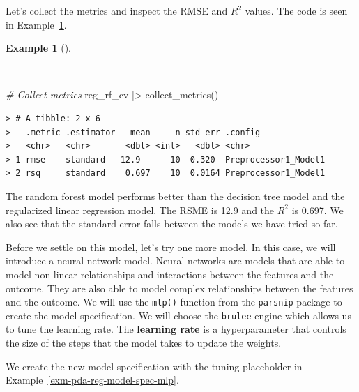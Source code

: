 \documentclass[
  letterpaper,
]{latex/krantz}
\newenvironment{Shaded}{\begin{snugshade}}{\end{snugshade}}
\newcommand{\CommentTok}[1]{\textcolor[rgb]{0.00,0.00,0.00}{\textit{#1}}}
\newcommand{\FunctionTok}[1]{\textcolor[rgb]{0.00,0.00,0.00}{#1}}
\newcommand{\NormalTok}[1]{\textcolor[rgb]{0.00,0.00,0.00}{#1}}
\newcommand{\SpecialCharTok}[1]{\textcolor[rgb]{0.00,0.00,0.00}{#1}}
\theoremstyle{definition}
\newtheorem{example}{Example}[chapter]
\theoremstyle{remark}
\begin{document}
Let's collect the metrics and inspect the RMSE and \(R^2\) values. The
code is seen in Example~\ref{exm-pda-reg-metrics-rf}.

\begin{example}[]\protect\hypertarget{exm-pda-reg-metrics-rf}{}\label{exm-pda-reg-metrics-rf}

~

\begin{Shaded}
\begin{Highlighting}[]
\CommentTok{\# Collect metrics}
\NormalTok{reg\_rf\_cv }\SpecialCharTok{|\textgreater{}} \FunctionTok{collect\_metrics}\NormalTok{()}
\end{Highlighting}
\end{Shaded}

\begin{verbatim}
> # A tibble: 2 x 6
>   .metric .estimator   mean     n std_err .config             
>   <chr>   <chr>       <dbl> <int>   <dbl> <chr>               
> 1 rmse    standard   12.9      10  0.320  Preprocessor1_Model1
> 2 rsq     standard    0.697    10  0.0164 Preprocessor1_Model1
\end{verbatim}

\end{example}

The random forest model performs better than the decision tree model and
the regularized linear regression model. The RSME is 12.9 and the
\(R^2\) is 0.697. We also see that the standard error falls between the
models we have tried so far.

Before we settle on this model, let's try one more model. In this case,
we will introduce a neural network model. Neural networks are models
that are able to model non-linear relationships and interactions between
the features and the outcome. They are also able to model complex
relationships between the features and the outcome. We will use the
\texttt{mlp()} function from the \texttt{parsnip} package to create the
model specification. We will choose the \texttt{brulee} engine which
allows us to tune the learning rate. The \textbf{learning rate} is a
hyperparameter that controls the size of the steps that the model takes
to update the weights.

We create the new model specification with the tuning placeholder in
Example~\ref{exm-pda-reg-model-spec-mlp}.
\end{document}
